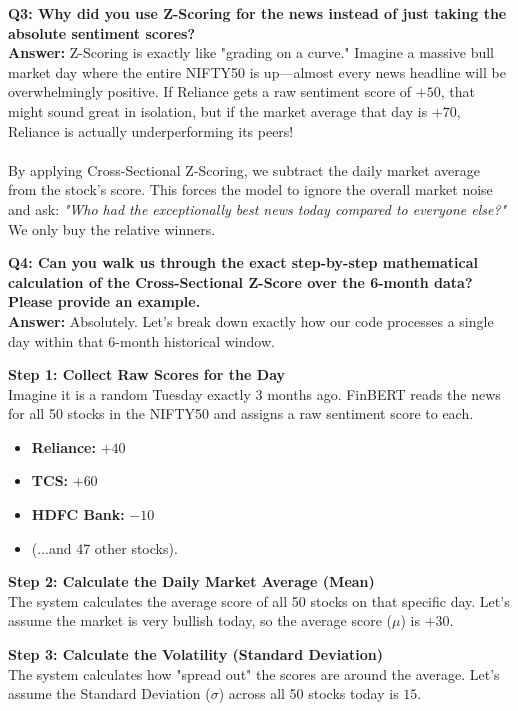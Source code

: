 \documentclass[11pt, a4paper]{article}
\begin{document}
\textbf{\textcolor{IITBlue}{Q3: Why did you use Z-Scoring for the news instead of just taking the absolute sentiment scores?}} \\
\textbf{Answer:} Z-Scoring is exactly like "grading on a curve." Imagine a massive bull market day where the entire NIFTY50 is up—almost every news headline will be overwhelmingly positive. If Reliance gets a raw sentiment score of $+50$, that might sound great in isolation, but if the market average that day is $+70$, Reliance is actually underperforming its peers!
\\ \\
By applying Cross-Sectional Z-Scoring, we subtract the daily market average from the stock's score. This forces the model to ignore the overall market noise and ask: \textit{"Who had the exceptionally best news today compared to everyone else?"} We only buy the relative winners.

\textbf{\textcolor{IITBlue}{Q4: Can you walk us through the exact step-by-step mathematical calculation of the Cross-Sectional Z-Score over the 6-month data? Please provide an example.}} \\
\textbf{Answer:} Absolutely. Let's break down exactly how our code processes a single day within that 6-month historical window.

\textbf{Step 1: Collect Raw Scores for the Day} \\
Imagine it is a random Tuesday exactly 3 months ago. FinBERT reads the news for all 50 stocks in the NIFTY50 and assigns a raw sentiment score to each.
\begin{itemize}[noitemsep]
    \item \textbf{Reliance:} $+40$
    \item \textbf{TCS:} $+60$
    \item \textbf{HDFC Bank:} $-10$
    \item (...and 47 other stocks).
\end{itemize}

\textbf{Step 2: Calculate the Daily Market Average (Mean)} \\
The system calculates the average score of all 50 stocks on that specific day. Let's assume the market is very bullish today, so the average score ($\mu$) is $+30$.

\textbf{Step 3: Calculate the Volatility (Standard Deviation)} \\
The system calculates how "spread out" the scores are around the average. Let's assume the Standard Deviation ($\sigma$) across all 50 stocks today is $15$.
\end{document}
